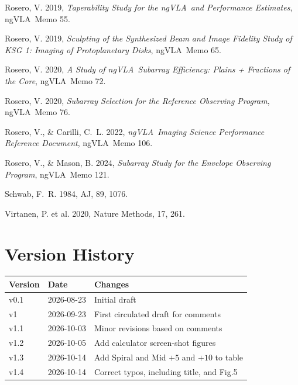\documentclass[11pt]{article}
\newcommand{\ngvla}{ngVLA}
\begin{document}
\begin{thebibliography}{}
Rosero, V. 2019, {\it Taperability Study for the \ngvla\ and
Performance Estimates}, \ngvla\ Memo 55.

Rosero, V. 2019, {\it Sculpting of the Synthesized Beam and Image
Fidelity Study of KSG 1: Imaging of Protoplanetary Disks}, \ngvla\
Memo 65.

Rosero, V. 2020, {\it A Study of \ngvla\ Subarray Efficiency: Plains +
Fractions of the Core}, \ngvla\ Memo 72.

Rosero, V. 2020, {\it Subarray Selection for the Reference Observing
Program}, \ngvla\ Memo 76.


Rosero, V., \& Carilli, C.~L. 2022, {\it \ngvla\ Imaging Science
Performance Reference Document}, \ngvla\ Memo 106.

Rosero, V., \& Mason, B. 2024, {\it Subarray Study for the Envelope
Observing Program}, \ngvla\ Memo 121.

Schwab, F.~R. 1984, AJ, 89, 1076.

Virtanen, P. et al. 2020, Nature Methods, 17, 261.
\end{thebibliography}

\section*{Version History}

\begin{tabular}{@{}lll@{}}
\textbf{Version} & \textbf{Date} & \textbf{Changes} \\
\hline
v0.1 & 2026-08-23 & Initial draft \\
v1 & 2026-09-23 & First circulated draft for comments \\
v1.1 & 2026-10-03 & Minor revisions based on comments \\
v1.2 & 2026-10-05 & Add calculator screen-shot figures \\
v1.3 & 2026-10-14 & Add Spiral and Mid $+5$ and $+10$ to table \\
v1.4 & 2026-10-14 & Correct typos, including title, and Fig.5 \\
\end{tabular}

\appendix
\end{document}

